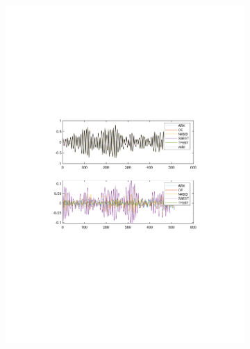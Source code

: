 \documentclass[]{article}
\begin{document}
\begin{figure}[ht]
\centering
\begin{subfigure}{.49\textwidth}
	\centering
	\includegraphics[trim= 10cm 8cm 10cm 8cm, scale=0.4]{figures/simulations.pdf}
\end{subfigure}
\begin{subfigure}{.49\textwidth}
	\centering

\end{subfigure}
\end{figure}
\end{document}
